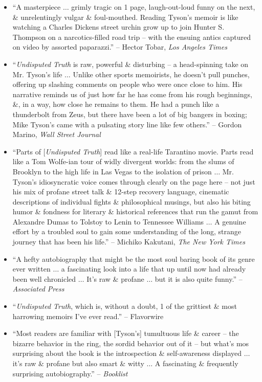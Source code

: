 \documentclass{article}
\numberwithin{equation}{section}
\begin{document}
\begin{itemize}
	\item ``A masterpiece $\ldots$ grimly tragic on 1 page, laugh-out-loud funny on the next, \& unrelentingly vulgar \& foul-mouthed. Reading Tyson's memoir is like watching a Charles Dickens street urchin grow up to join Hunter S. Thompson on a narcotics-filled road trip -- with the ensuing antics captured on video by assorted paparazzi.'' -- Hector Tobar, \textit{Los Angeles Times}
	\item ``\textit{Undisputed Truth} is raw, powerful \& disturbing -- a head-spinning take on Mr. Tyson's life $\ldots$ Unlike other sports memoirists, he doesn't pull punches, offering up slashing comments on people who were once close to him. His narrative reminds us of just how far he has come from his rough beginnings, \&, in a way, how close he remains to them. He had a punch like a thunderbolt from Zeus, but there have been a lot of big bangers in boxing; Mike Tyson's came with a pulsating story line like few others.'' -- Gordon Marino, \textit{Wall Street Journal}
	\item ``Parts of [\textit{Undisputed Truth}] read like a real-life Tarantino movie. Parts read like a Tom Wolfe-ian tour of widly divergent worlds: from the slums of Brooklyn to the high life in Las Vegas to the isolation of prison $\ldots$ Mr. Tyson's idiosyncratic voice comes through clearly on the page here -- not just his mix of profane street talk \& 12-step recovery language, cinematic descriptions of individual fights \& philosophical musings, but also his biting humor \& fondness for literary \& historical references that run the gamut from Alexandre Dumas to Tolstoy to Lenin to Tennessee Williams $\ldots$ A genuine effort by a troubled soul to gain some understanding of the long, strange journey that has been his life.'' -- Michiko Kakutani, \textit{The New York Times}
	\item ``A hefty autobiography that might be the most soul baring book of its genre ever written $\ldots$ a fascinating look into a life that up until now had already been well chronicled $\ldots$ It's raw \& profane $\ldots$ but it is also quite funny.'' -- \textit{Associated Press}
	\item ``\textit{Undisputed Truth}, which is, without a doubt, 1 of the grittiest \& most harrowing memoirs I've ever read.'' -- Flavorwire
	\item ``Most readers are familiar with [Tyson's] tumultuous life \& career -- the bizarre behavior in the ring, the sordid behavior out of it -- but what's mos surprising about the book is the introspection \& self-awareness displayed $\ldots$ it's raw \& profane but also smart \& witty $\ldots$ A fascinating \& frequently surprising autobiography.'' -- \textit{Booklist}

\end{itemize}
\end{document}
